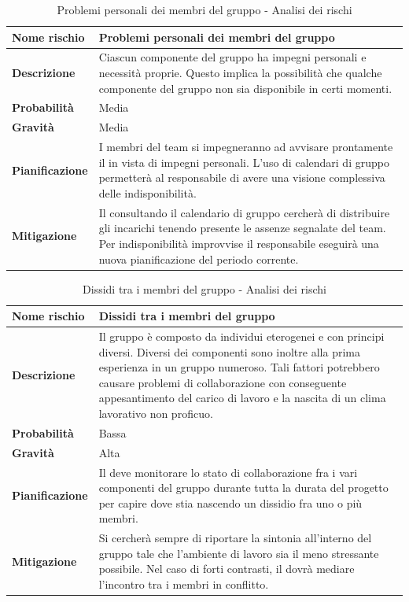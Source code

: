 \documentclass[12pt,a4paper]{article}
\begin{document}
\begin{table}[H]
\begin{center}
\begin{tabular}{p{} p{}}
\toprule
\textbf{Nome rischio} & \textbf{Problemi personali dei membri del gruppo} \\
\midrule
\midrule
\textbf{Descrizione} & Ciascun componente del gruppo ha impegni personali e necessità proprie. Questo implica la possibilità che qualche componente del gruppo non sia disponibile in certi momenti. \\
\midrule
\textbf{Probabilità} & Media \\
\midrule
\textbf{Gravità} & Media \\
\midrule
\textbf{Pianificazione} & I membri del team si impegneranno ad avvisare prontamente il \PM{} in vista di impegni personali. L’uso di calendari di gruppo permetterà al responsabile di avere una visione complessiva delle indisponibilità.  \\
\midrule
\textbf{Mitigazione} & Il \PM{} consultando il calendario di gruppo cercherà di distribuire gli incarichi tenendo presente le assenze segnalate del team. Per indisponibilità improvvise il responsabile eseguirà una nuova pianificazione del periodo corrente. \\
\bottomrule
\end{tabular}
\caption{Problemi personali dei membri del gruppo - Analisi dei rischi}
\end{center}
\end{table}

\begin{table}[H]
\begin{center}
\begin{tabular}{p{} p{}}
\toprule
\textbf{Nome rischio} & \textbf{Dissidi tra i membri del gruppo} \\
\midrule
\midrule
\textbf{Descrizione} & Il gruppo è composto da individui eterogenei e con principi diversi. Diversi dei componenti sono inoltre alla prima esperienza in un gruppo numeroso. Tali fattori potrebbero causare problemi di collaborazione con conseguente appesantimento del carico di lavoro e la nascita di un clima lavorativo non proficuo. \\
\midrule
\textbf{Probabilità} & Bassa \\
\midrule
\textbf{Gravità} & Alta \\
\midrule
\textbf{Pianificazione} & Il \PM{} deve monitorare lo stato di collaborazione fra i vari componenti del gruppo durante tutta la durata del progetto per capire dove stia nascendo un dissidio fra uno o più membri. \\
\midrule
\textbf{Mitigazione} & Si cercherà sempre di riportare la sintonia all’interno del gruppo tale che l’ambiente di lavoro sia il meno stressante possibile. Nel caso di forti contrasti, il \PM{} dovrà mediare l’incontro tra i membri in conflitto. \\
\bottomrule
\end{tabular}
\caption{Dissidi tra i membri del gruppo - Analisi dei rischi}
\end{center}
\end{table}
\end{document}
